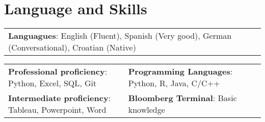 \documentclass[letterpaper,11pt]{article}
\makeatletter
\newcommand{\resumeItem}[1]{
  \item\small{
    {#1 \vspace{-2pt}}
  }
}
\newcommand{\resumeProjectHeading}[2]{
    \item
    \begin{tabular*}{0.97\textwidth}{l@{\extracolsep{\fill}}r}
      \small#1 & #2 \\
    \end{tabular*}\vspace{-7pt}
}
\newcommand{\resumeSubHeadingListStart}{\begin{itemize}[leftmargin=0.15in, label={}]}
\newcommand{\resumeSubHeadingListEnd}{\end{itemize}}
\newcommand{\resumeItemListStart}{\begin{itemize}}
\newcommand{\resumeItemListEnd}{\end{itemize}\vspace{-5pt}}
\makeatother
\begin{document}


%
\section{Language and Skills}
\begin{center}
\begin{tabularx}{0.96\textwidth} { 
  >{\raggedright\arraybackslash}X
}
  \small{\textbf{Languagues}: English (Fluent), Spanish (Very good), German (Conversational), Croatian (Native)}
\end{tabularx}
\end{center}

\begin{center}
\begin{tabularx}{0.96\textwidth} { 
  >{\raggedright\arraybackslash}X 
   >{\raggedright\arraybackslash}X 
   >{\raggedright\arraybackslash}X 
   >{\raggedright\arraybackslash}X
}
\small{\textbf{Professional proficiency}: Python, Excel, SQL, Git} & \small{\hspace{3pt}\textbf{Programming Languages}: Python, R, Java, C/C++} \\
\small{\textbf{Intermediate proficiency}: Tableau, Powerpoint, Word} & \small{\hspace{3pt}\textbf{Bloomberg Terminal}: Basic knowledge} \\
\end{tabularx}
\end{center}
\end{document}
